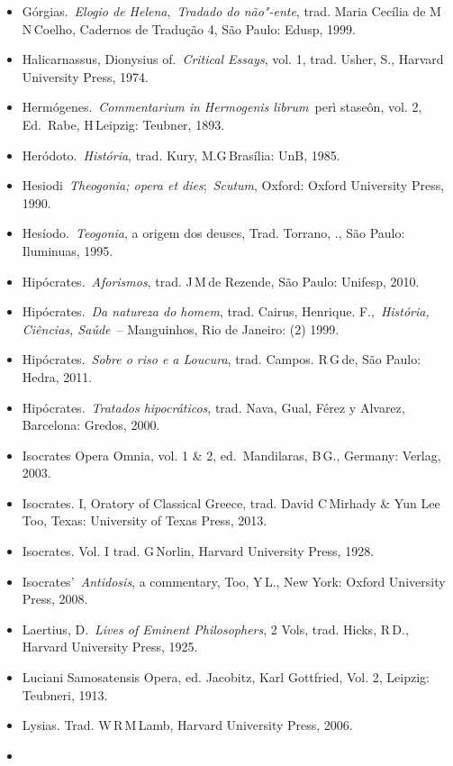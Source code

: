 {\begin{itemize}
  [Hrsg] Hamburg: Verlag, 1989.
\item
  Górgias.~\emph{Elogio de Helena},~\emph{Tradado do não"-ente}, trad.
  Maria Cecília de M\,N\,Coelho, Cadernos de Tradução 4, São Paulo:
  Edusp, 1999.
\item
  Halicarnassus, Dionysius of.~\emph{Critical Essays}, vol. 1, trad.
  Usher, S., Harvard University Press, 1974.
\item
  Hermógenes.~\emph{Commentarium in Hermogenis librum}~perì staseôn,
  vol. 2, Ed.~Rabe, H\,Leipzig: Teubner, 1893.
\item
  Heródoto.~\emph{História}, trad. Kury, M.G\,Brasília: UnB, 1985.
\item
  Hesiodi~\emph{Theogonia; opera et dies};~\emph{Scutum}, Oxford: Oxford
  University Press, 1990.
\item
  Hesíodo.~\emph{Teogonia}, a origem dos deuses, Trad. Torrano, .,
  São Paulo: Iluminuas, 1995.
\item
  Hipócrates.~\emph{Aforismos}, trad. J\,M\,de Rezende, São Paulo:
  Unifesp, 2010.
\item
  Hipócrates.~\emph{Da natureza do homem}, trad. Cairus, Henrique.
  F.,~\emph{História, Ciências, Saúde}~-- Manguinhos, Rio de Janeiro: 
  (2) 1999.
\item
  Hipócrates.~\emph{Sobre o riso e a Loucura}, trad. Campos. R\,G\,de,
  São Paulo: Hedra, 2011.
\item
  Hipócrates.~\emph{Tratados hipocráticos}, trad. Nava, Gual, Férez y
  Alvarez, Barcelona: Gredos, 2000.
\item
  Isocrates Opera Omnia, vol. 1 \& 2, ed.~Mandilaras, B\,G., Germany:
  Verlag, 2003.
\item
  Isocrates. I, Oratory of Classical Greece, trad. David C\,Mirhady \&
  Yun Lee Too, Texas: University of Texas Press, 2013.
\item
  Isocrates. Vol. I trad. G\,Norlin, Harvard University Press, 1928.
\item
  Isocrates'~\emph{Antidosis}, a commentary, Too, Y\,L., New York:
  Oxford University Press, 2008.
\item
  Laertius, D.~\emph{Lives of Eminent Philosophers}, 2 Vols, trad.
  Hicks, R\,D., Harvard University Press, 1925.
\item
  Luciani Samosatensis Opera, ed. Jacobitz, Karl Gottfried, Vol. 2,
  Leipzig: Teubneri, 1913.
\item
  Lysias. Trad. W\,R\,M\,Lamb, Harvard University Press, 2006.
\item

\end{itemize}}
